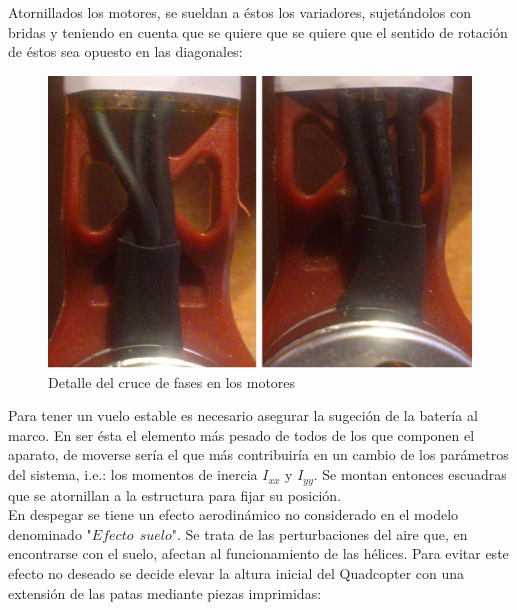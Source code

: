 \documentclass[twoside,11pt]{book}
\begin{document}
Atornillados los motores, se sueldan a éstos los variadores, sujetándolos con bridas y teniendo en cuenta que se quiere que se quiere que el sentido de rotación de éstos sea opuesto en las diagonales:\\

\begin{figure}[h!]
\begin{center}
\includegraphics[scale=0.15,bb=0 0 1050 700]{images/comp_motor_wires.png}
\end{center}
\caption{Detalle del cruce de fases en los motores}
\label{detalle_cable_motor}
\end{figure}

Para tener un vuelo estable es necesario asegurar la sugeción de la batería al marco. En ser ésta el elemento más pesado de todos de los que componen el aparato, de moverse sería el que más contribuiría en un cambio de los parámetros del sistema, i.e.: los momentos de inercia $I_{xx}$ y $I_{yy}$. Se montan entonces escuadras que se atornillan a la estructura para fijar su posición. \\

En despegar se tiene un efecto aerodinámico no considerado en el modelo denominado "$Efecto \>\> suelo$". Se trata de las perturbaciones del aire que, en encontrarse con el suelo, afectan al funcionamiento de las hélices. Para evitar este efecto no deseado se decide elevar la altura inicial del Quadcopter con una extensión de las patas mediante piezas imprimidas: \\
\end{document}
